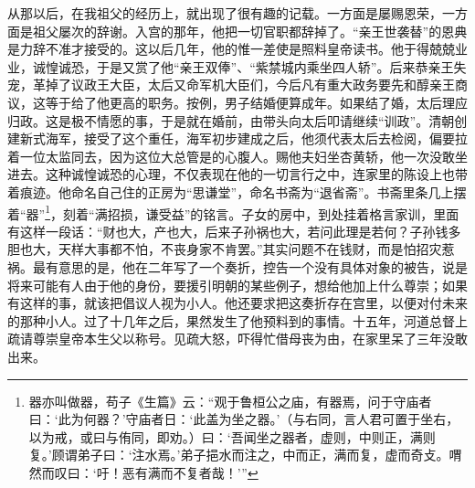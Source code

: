 从那以后，在我祖父的经历上，就出现了很有趣的记载。一方面是屡赐恩荣，一方面是祖父屡次的辞谢。入宫的那年，他把一切官职都辞掉了。“亲王世袭替”的恩典是力辞不准才接受的。这以后几年，他的惟一差使是照料皇帝读书。他于得兢兢业业，诚惶诚恐，于是又赏了他“亲王双俸”、“紫禁城内乘坐四人轿”。后来恭亲王失宠，革掉了议政王大臣，太后又命军机大臣们，今后凡有重大政务要先和醇亲王商议，这等于给了他更高的职务。按例，男子结婚便算成年。如果结了婚，太后理应归政。这是极不情愿的事，于是就在婚前，由带头向太后叩请继续“训政”。清朝创建新式海军，接受了这个重任，海军初步建成之后，他须代表太后去检阅，偏要拉着一位太监同去，因为这位大总管是的心腹人。赐他夫妇坐杏黄轿，他一次没敢坐进去。这种诚惶诚恐的心理，不仅表现在他的一切言行之中，连家里的陈设上也带着痕迹。他命名自己住的正房为“思谦堂”，命名书斋为“退省斋”。书斋里条几上摆着“器”\footnote{器亦叫做器，苟子《生篇》云：“观于鲁桓公之庙，有器焉，问于守庙者曰：‘此为何器？’守庙者日：‘此盖为坐之器。’（与右同，言人君可置于坐右，以为戒，或曰与侑同，即劝。）曰：‘吾闻坐之器者，虚则，中则正，满则复。’顾谓弟子曰：‘注水焉。’弟子挹水而注之，中而正，满而复，虚而奇攴。喟然而叹曰：‘吁！恶有满而不复者哉！’”}，刻着“满招损，谦受益”的铭言。子女的房中，到处挂着格言家训，里面有这样一段话：“财也大，产也大，后来子孙祸也大，若问此理是若何？子孙钱多胆也大，天样大事都不怕，不丧身家不肯罢。”其实问题不在钱财，而是怕招灾惹祸。最有意思的是，他在二年写了一个奏折，控告一个没有具体对象的被告，说是将来可能有人由于他的身份，要援引明朝的某些例子，想给他加上什么尊崇；如果有这样的事，就该把倡议人视为小人。他还要求把这奏折存在宫里，以便对付未来的那种小人。过了十几年之后，果然发生了他预料到的事情。十五年，河道总督上疏请尊崇皇帝本生父以称号。见疏大怒，吓得忙借母丧为由，在家里呆了三年没敢出来。\\

